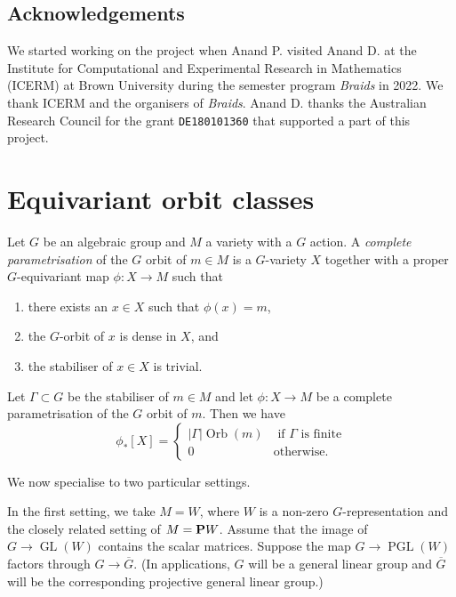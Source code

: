 \documentclass[11pt]{amsart}
\renewcommand {\P}{{\bf P}}
\providecommand{\GL}{\operatorname{GL}}
\providecommand{\PGL}{\operatorname{PGL}}
\DeclareMathOperator{\Orb}{Orb}
\begin{document}
\subsection{Acknowledgements}
We started working on the project when Anand P. visited Anand D. at the Institute for Computational and Experimental Research in Mathematics (ICERM) at Brown University during the semester program \emph{Braids} in 2022.
We thank ICERM and the organisers of \emph{Braids}.
Anand D. thanks the Australian Research Council for the grant \texttt{DE180101360} that supported a part of this project.

\section{Equivariant orbit classes}\label{sec:grass}
Let \(G\) be an algebraic group and \(M\) a variety with a \(G\) action.
A \emph{complete parametrisation} of the \(G\) orbit of \(m \in M\) is a \(G\)-variety \(X\) together with a proper \(G\)-equivariant map \(\phi \colon X \to M\) such that
\begin{enumerate}
\item there exists an \(x \in X\) such that \(\phi (x) = m\),
\item the  \(G\)-orbit of \(x\) is dense in \(X\), and
\item the stabiliser of \(x \in X\) is trivial.
\end{enumerate}

Let \(\Gamma \subset G\) be the stabiliser of \(m \in M\) and let \(\phi \colon X \to M\) be a complete parametrisation of the \(G\) orbit of \(m\).
Then we have
\begin{equation}\label{eq:worb}
  \phi_*[X] = \begin{cases}
    |\Gamma| \Orb(m) & \text{ if \(\Gamma\) is finite} \\
    0 & \text{otherwise}.
    \end{cases}
\end{equation}

We now specialise to two particular settings.

In the first setting, we take \(M = W\), where \(W\) is a non-zero \(G\)-representation and the closely related setting of \(M = \P W\).
Assume that the image of \(G \to \GL(W)\) contains the scalar matrices.
Suppose the map \(G \to \PGL(W)\) factors through \(G \to \overline G\).
(In applications, \(G\) will be a general linear group and \(\overline G\) will be the corresponding projective general linear group.)
\end{document}
